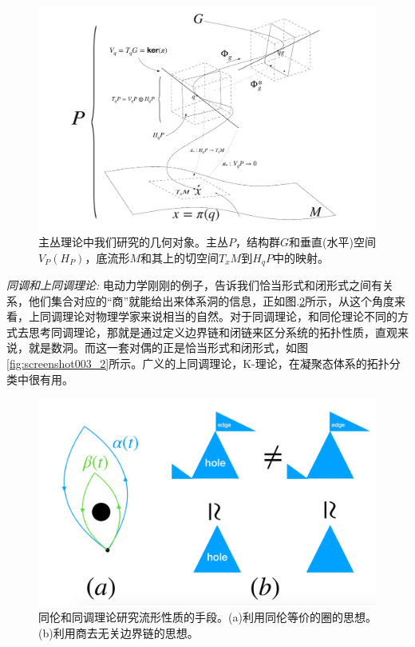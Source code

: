 \documentclass[supercite]{HustGraduPaper}
\begin{document}
	
\begin{figure}
	\centering
	\includegraphics[width=1\linewidth]{Figures/figure}
	\caption{主丛理论中我们研究的几何对象。主丛$P$，结构群$G$和垂直(水平)空间$V_P(H_P)$，底流形$M$和其上的切空间$T_xM$到$H_qP$中的映射。}
	\label{fig:figure}
\end{figure}
	\textit{同调和上同调理论:} 电动力学刚刚的例子，告诉我们恰当形式和闭形式之间有关系，他们集合对应的“商”就能给出来体系洞的信息，正如图.\ref{fig:screenshot002}所示，从这个角度来看，上同调理论对物理学家来说相当的自然。对于同调理论，和同伦理论不同的方式去思考同调理论，那就是通过定义边界链和闭链来区分系统的拓扑性质，直观来说，就是数洞。而这一套对偶的正是恰当形式和闭形式，如图\ref{fig:screenshot003_2}所示。广义的上同调理论，K-理论，在凝聚态体系的拓扑分类中很有用\cite{kitaev2009periodic,kawabata2018symmetry}。
	\begin{figure}
		\centering
		\includegraphics[width=1\linewidth]{Figures/screenshot002}
		\caption{同伦和同调理论研究流形性质的手段。(a)利用同伦等价的圈的思想。(b)利用商去无关边界链的思想。}
		\label{fig:screenshot002}
	\end{figure}
\end{document}
